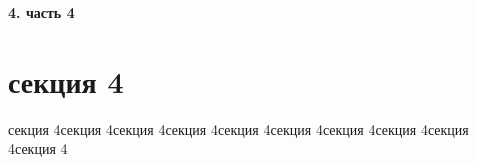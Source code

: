 \newpage
\begin{center}
  \textbf{\large 4. часть 4}
\end{center}


\section{секция 4}

секция 4секция 4секция 4секция 4секция 4секция 4секция 4секция 4секция 4секция 4
